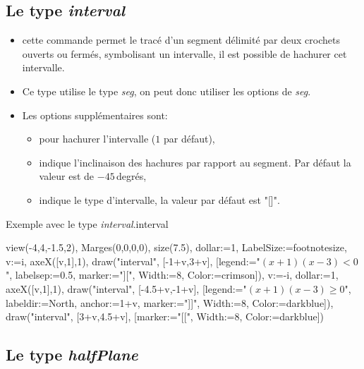 \subsection{Le type \emph{interval}}

{\centering {}\par}

\begin{itemize}
 \item\desc cette commande permet le tracé d'un segment délimité par deux crochets ouverts ou fermés, symbolisant un intervalle, il est possible de hachurer cet intervalle. 
 \item Ce type utilise le type \emph{seg}, on peut donc utiliser les options de \emph{seg}.
 \item Les options supplémentaires sont:
  \begin{itemize}
   \item {} pour hachurer l'intervalle ($1$ par défaut),
   \item {} indique l'inclinaison des hachures par rapport au segment. Par défaut la valeur est de $-45$\,degrés,
   \item \opt{marker}{"[]" ou "[[" ou "]]" ou "]["} indique le type d'intervalle, la valeur par défaut est "[]".
  \end{itemize}
\end{itemize}

\begin{demo}{Exemple avec le type \emph{interval}.}{interval}
\begin{texgraph}[name=interval]
view(-4,4,-1.5,2), Marges(0,0,0,0), size(7.5),
dollar:=1, LabelSize:=footnotesize,
v:=i, axeX([v,1],1),
draw("interval", [-1+v,3+v], [legend:="$(x+1)(x-3)<0$",
 labelsep:=0.5, marker:="][", Width:=8, Color:=crimson]),
v:=-i, dollar:=1, axeX([v,1],1),
draw("interval", [-4.5+v,-1+v], 
 [legend:="$(x+1)(x-3)\geqslant0$", labeldir:=North,
  anchor:=1+v, marker:="]]", Width:=8, Color:=darkblue]),
draw("interval", [3+v,4.5+v], 
 [marker:="[[", Width:=8, Color:=darkblue])
\end{texgraph}
\end{demo}

\subsection{Le type \emph{halfPlane}}

{\centering {}\par}

